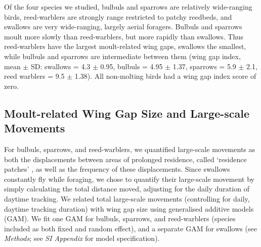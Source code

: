 Of the four species we studied, bulbuls and sparrows are relatively wide-ranging birds, reed-warblers are strongly range restricted to patchy reedbeds, and swallows are very wide-ranging, largely aerial foragers.
Bulbuls and sparrows moult more slowly than reed-warblers, but more rapidly than swallows.
Thus reed-warblers have the largest moult-related wing gaps, swallows the smallest, while bulbuls and sparrows are intermediate between them {(wing gap index, mean $\pm$ SD: swallows = 4.3 $\pm$ 0.95, bulbuls = 4.95 $\pm$ 1.37, sparrows = 5.9 $\pm$ 2.1, reed warblers = 9.5 $\pm$ 1.38)}.
All non-molting birds had a wing gap index score of zero.

\subsection*{Moult-related Wing Gap Size and Large-scale Movements}

For bulbuls, sparrows, and reed-warblers, we quantified large-scale movements as both the displacements between areas of prolonged residence, called `residence patches' \cite{gupte2022d}, as well as the frequency of these displacements.
Since swallows constantly fly while foraging, we chose to quantify their large-scale movement by simply calculating the total distance moved, adjusting for the daily duration of daytime tracking.
We related total large-scale movements (controlling for daily, daytime tracking duration) with wing gap size using generalised additive models (GAM).
We fit one GAM for bulbuls, sparrows, and reed-warblers (species included as both fixed and random effect), and a separate GAM for swallows (see \textit{Methods}; see \textit{SI Appendix} for model specification).

